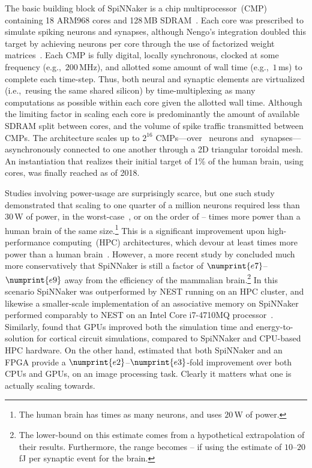 The basic building block of SpiNNaker is a chip multiprocessor~(CMP) containing 18 ARM968 cores and 128\,MB SDRAM~\citep{painkras2013spinnaker, furber2013overview}.
Each core was prescribed to simulate  spiking neurons and  synapses, although Nengo's integration doubled this target by achieving  neurons per core through the use of factorized weight matrices~\citep{mundy2015}.
Each CMP is fully digital, locally synchronous, clocked at some frequency (e.g.,~$200$\,MHz), and allotted some amount of wall time (e.g.,~$1$\,ms) to complete each time-step.
Thus, both neural and synaptic elements are virtualized (i.e.,~reusing the same shared silicon) by time-multiplexing as many computations as possible within each core given the allotted wall time.
Although the limiting factor in scaling each core is predominantly the amount of available SDRAM split between cores, and the volume of spike traffic transmitted between CMPs.
The architecture scales up to $2^{16}$ CMPs---over ~neurons and ~synapses---asynchronously connected to one another through a 2D triangular toroidal mesh.
An instantiation that realizes their initial target of 1\% of the human brain, using  cores, was finally reached as of 2018.

Studies involving power-usage are surprisingly scarce, but one such study demonstrated that scaling to one quarter of a million neurons required less than $30$\,W of power, in the worst-case~\citep{stromatias2013power}, or on the order of -- times more power than a human brain of the same size.\footnote{
The human brain has  times as many neurons, and uses $20$\,W of power.}
This is a significant improvement upon high-performance computing~(HPC) architectures, which devour at least  times more power than a human brain~\citep{furber2012build}. 
However, a more recent study by \citet{van2018performance} concluded much more conservatively that SpiNNaker is still a factor of $\numprint{e7}$--$\numprint{e9}$ away from the efficiency of the mammalian brain.\footnote{
The lower-bound on this estimate comes from a hypothetical extrapolation of their results. Furthermore, the range becomes -- if using the estimate of $10$--$20$\,fJ per synaptic event for the brain.}
In this scenario SpiNNaker was outperformed by NEST running on an HPC cluster, and likewise a smaller-scale implementation of an associative memory on SpiNNaker performed comparably to NEST on an Intel Core i7-4710MQ processor~\citep{stockel2017binary}.
Similarly, \citet{knight2018gpus} found that GPUs improved both the simulation time and energy-to-solution for cortical circuit simulations, compared to SpiNNaker and CPU-based HPC hardware.
On the other hand, \citet{sugiarto2016high} estimated that both SpiNNaker and an FPGA provide a $\numprint{e2}$--$\numprint{e3}$-fold improvement over both CPUs and GPUs, on an image processing task. 
Clearly it matters what one is actually scaling towards.

